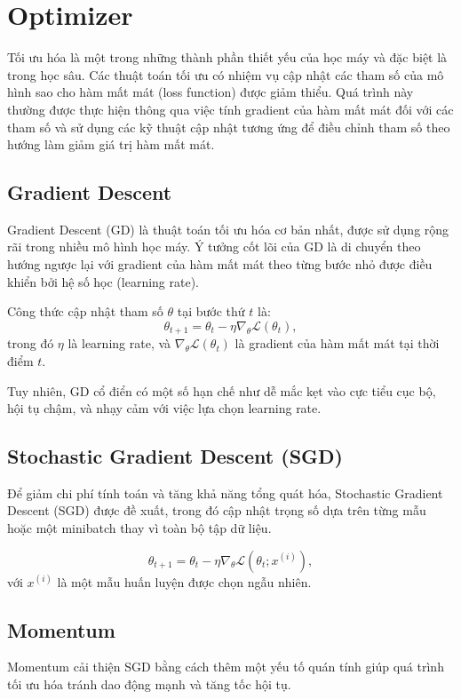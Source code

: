 \section{Optimizer}
Tối ưu hóa là một trong những thành phần thiết yếu của học máy và đặc biệt là trong học sâu. Các thuật toán tối ưu có nhiệm vụ cập nhật các tham số của mô hình sao cho hàm mất mát (loss function) được giảm thiểu. Quá trình này thường được thực hiện thông qua việc tính gradient của hàm mất mát đối với các tham số và sử dụng các kỹ thuật cập nhật tương ứng để điều chỉnh tham số theo hướng làm giảm giá trị hàm mất mát.

\subsection{Gradient Descent}
Gradient Descent (GD) là thuật toán tối ưu hóa cơ bản nhất, được sử dụng rộng rãi trong nhiều mô hình học máy. Ý tưởng cốt lõi của GD là di chuyển theo hướng ngược lại với gradient của hàm mất mát theo từng bước nhỏ được điều khiển bởi hệ số học (learning rate).

Công thức cập nhật tham số \( \theta \) tại bước thứ \( t \) là:
\begin{equation}
    \theta_{t+1} = \theta_t - \eta \nabla_\theta \mathcal{L}(\theta_t),
\end{equation}
trong đó \( \eta \) là learning rate, và \( \nabla_\theta \mathcal{L}(\theta_t) \) là gradient của hàm mất mát tại thời điểm \( t \).

Tuy nhiên, GD cổ điển có một số hạn chế như dễ mắc kẹt vào cực tiểu cục bộ, hội tụ chậm, và nhạy cảm với việc lựa chọn learning rate.

\subsection{Stochastic Gradient Descent (SGD)}
Để giảm chi phí tính toán và tăng khả năng tổng quát hóa, Stochastic Gradient Descent (SGD) được đề xuất, trong đó cập nhật trọng số dựa trên từng mẫu hoặc một minibatch thay vì toàn bộ tập dữ liệu.

\begin{equation}
    \theta_{t+1} = \theta_t - \eta \nabla_\theta \mathcal{L}(\theta_t; x^{(i)}),
\end{equation}
với \( x^{(i)} \) là một mẫu huấn luyện được chọn ngẫu nhiên.

\subsection{Momentum}
Momentum cải thiện SGD bằng cách thêm một yếu tố quán tính giúp quá trình tối ưu hóa tránh dao động mạnh và tăng tốc hội tụ.

